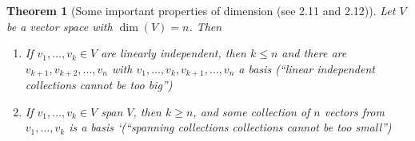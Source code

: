 \documentclass[10pt]{article}
\newtheorem{theorem}{Theorem}
\theoremstyle{definition}
\begin{document}
\begin{theorem}[Some important properties of dimension (see 2.11 and 2.12)]
  \label{thm:some-important-properties-dimension}
  Let $V$ be a vector space with $\dim(V)=n$. Then
  \begin{enumerate}
    \item [(a)] If $v_{1},\ldots,v_{k}\in V$ are linearly independent, then
    $k \leq n$ and there are $v_{k+1},v_{k+2},\ldots,v_{n}$ with
    $v_{1},\ldots,v_{k},v_{k+1},\ldots,v_{n}$ a basis (``linear independent
    collections cannot be too big'')
    \item [(b)] If $v_{1},\ldots,v_{k}\in V$ span $V$, then $k \geq n$, and some
    collection of $n$ vectors from $v_{1},\ldots,v_{k}$ is a basis
    `(``spanning collections collections cannot be too small'')
  \end{enumerate}
\end{theorem}
\end{document}
